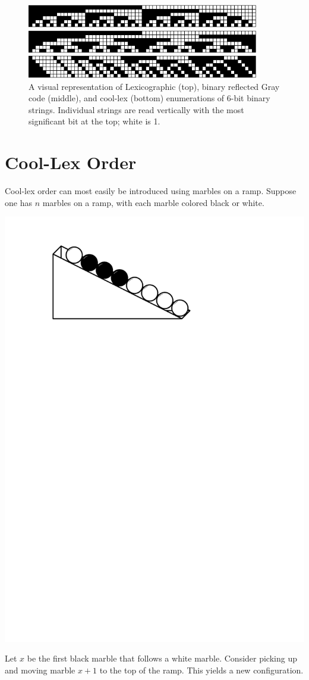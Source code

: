 \begin{figure}
    \centering
\includegraphics[width=4in]{BLX6-cropped.pdf} 

\includegraphics[width=4in]{BRGC6-cropped.pdf} 

\includegraphics[width=4in]{BCLX6-cropped.pdf} 

    \caption{A visual representation of Lexicographic (top), binary reflected Gray code (middle), and cool-lex (bottom) enumerations of 6-bit binary strings. Individual strings are read vertically with the most significant bit at the top; white is 1.
    }
    \label{binary}
\end{figure}

\section{Cool-Lex Order} \label{sec:coolIntro}

Cool-lex order can most easily be introduced using marbles on a ramp. Suppose one has $n$ marbles on a ramp, with each marble colored black or white.  

\includegraphics[width=.3\textwidth]{figures/marbles_first.pdf} 


Let $x$ be the first black marble that follows a white marble. Consider picking up and moving marble $x+1$ to the top of the ramp. This yields a new configuration.


